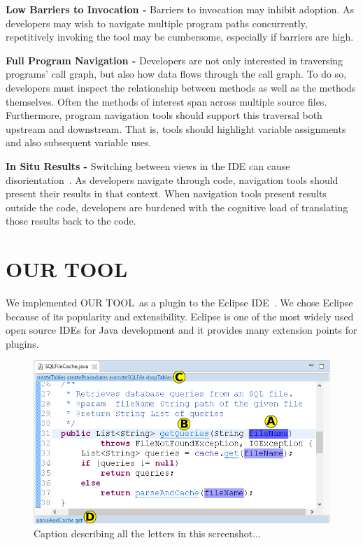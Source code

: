 \documentclass[conference]{IEEEtran}
\newcommand{\toolName}{OUR TOOL}
\begin{document}
\vspace{1em} 
\noindent\textbf{Low Barriers to Invocation -}
Barriers to invocation may inhibit adoption. 
As developers may wish to navigate multiple program paths concurrently, repetitively invoking the tool may be cumbersome, especially if barriers are high. 


\vspace{1em} 
\noindent\textbf{Full Program Navigation -}
Developers are not only interested in traversing programs' call graph, but also how data flows through the call graph.
To do so, developers must inspect the relationship between methods as well as the methods themselves.
Often the methods of interest span across multiple source files.
Furthermore, program navigation tools should support this traversal both upstream and downstream. 
That is, tools should highlight variable assignments and also subsequent variable uses. 

\vspace{1em} 
\noindent\textbf{In Situ Results -}
Switching between views in the IDE can cause disorientation~\cite{deAlwis2006disorient}. As developers navigate through code, navigation tools should present their results in that context. 
When navigation tools present results outside the code, developers are burdened with the cognitive load of translating those results back to the code.



\section{\toolName}
We implemented \toolName~as a plugin to the Eclipse IDE~\cite{Eclipse}. We chose Eclipse because of its popularity and extensibility. 
Eclipse is one of the most widely used open source IDEs for Java development and it provides many extension points for plugins. 

\begin{figure}
	\centering
	\includegraphics[width=\textwidth]{images/toolScreenshot}
	\caption{Caption describing all the letters in this screenshot...}
	\label{fig:merging} 
\end{figure}
\end{document}
